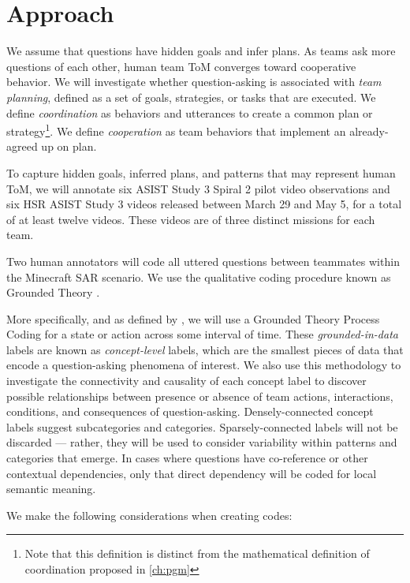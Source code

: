 \section{Approach}
\label{sec:question_plan_approach}

We assume that questions have hidden goals and infer
plans. As teams ask more questions of each other, human team ToM converges
toward cooperative behavior.  We will investigate whether question-asking is
associated with \emph{team planning}, defined as a set of goals, strategies, or
tasks that are executed.  We define \emph{coordination} as behaviors and
utterances to create a common plan or strategy\footnote{Note that this
definition is distinct from the mathematical definition of coordination
proposed in \autoref{ch:pgm}}. We define \emph{cooperation} as team behaviors
that implement an already-agreed up on plan.

To capture hidden goals, inferred plans, and patterns that may represent human
ToM, we will annotate six ASIST Study 3 Spiral 2 pilot video observations and
six HSR ASIST Study 3 videos released between March 29 and May 5, for a total
of at least twelve videos. These videos are of three distinct missions for each
team.

Two human annotators will code all uttered questions between teammates within
the Minecraft SAR scenario.  We use the qualitative coding procedure known as
Grounded Theory \citep{corbin_strauss_2015}.

More specifically, and as defined by \citet{saldana_2021}, we will use a
Grounded Theory Process Coding for a state or action across some interval of
time. These \emph{grounded-in-data} labels are known as \emph{concept-level}
labels, which are the smallest pieces of data that encode a question-asking
phenomena of interest. We also use this methodology to investigate the
connectivity and causality of each concept label to discover possible
relationships between presence or absence of team actions, interactions,
conditions, and consequences of question-asking. Densely-connected concept
labels suggest subcategories and categories. Sparsely-connected labels will not
be discarded --- rather, they will be used to consider variability within
patterns and categories that emerge. In cases where questions have co-reference
or other contextual dependencies, only that direct dependency will be coded for
local semantic meaning.

We make the following considerations when creating codes:

